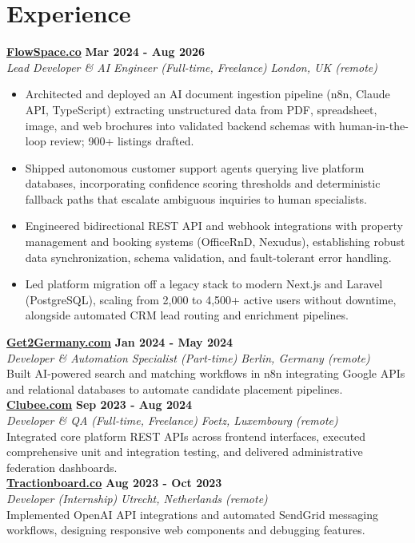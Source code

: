 \documentclass[a4paper,10pt]{article}
\newcommand{\role}[4]{%
 \textbf{#1} \hfill \textbf{#2}\\[1pt]%
 \textit{#3} \hfill \textit{#4}\\[2pt]%
}
\begin{document}
\section{Experience}

\role{\href{https://flowspace.co}{FlowSpace.co}}{Mar 2024 - Aug 2026}{Lead Developer \& AI Engineer (Full-time, Freelance)}{London, UK (remote)}
\begin{itemize}
 \item Architected and deployed an AI document ingestion pipeline (n8n, Claude API, TypeScript) extracting unstructured data from PDF, spreadsheet, image, and web brochures into validated backend schemas with human-in-the-loop review; 900+ listings drafted.
 \item Shipped autonomous customer support agents querying live platform databases, incorporating confidence scoring thresholds and deterministic fallback paths that escalate ambiguous inquiries to human specialists.
 \item Engineered bidirectional REST API and webhook integrations with property management and booking systems (OfficeRnD, Nexudus), establishing robust data synchronization, schema validation, and fault-tolerant error handling.
 \item Led platform migration off a legacy stack to modern Next.js and Laravel (PostgreSQL), scaling from 2,000 to 4,500+ active users without downtime, alongside automated CRM lead routing and enrichment pipelines.
\end{itemize}

\role{\href{https://get2germany.com}{Get2Germany.com}}{Jan 2024 - May 2024}{Developer \& Automation Specialist (Part-time)}{Berlin, Germany (remote)}
Built AI-powered search and matching workflows in n8n integrating Google APIs and relational databases to automate candidate placement pipelines.\\[1pt]

\role{\href{https://clubee.com}{Clubee.com}}{Sep 2023 - Aug 2024}{Developer \& QA (Full-time, Freelance)}{Foetz, Luxembourg (remote)}
Integrated core platform REST APIs across frontend interfaces, executed comprehensive unit and integration testing, and delivered administrative federation dashboards.\\[1pt]

\role{\href{https://tractionboard.co}{Tractionboard.co}}{Aug 2023 - Oct 2023}{Developer (Internship)}{Utrecht, Netherlands (remote)}
Implemented OpenAI API integrations and automated SendGrid messaging workflows, designing responsive web components and debugging features.
\end{document}
